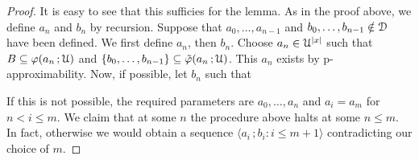 \documentclass{amsproc}
\begin{document}
{\begin{proof}
  
  It is easy to see that this sufficies for the lemma.
  As in the proof above, we define $a_n$ and $b_n$ by recursion.
  Suppose that $a_0,\dots,a_{n-1}$ and $b_0,\dots,b_{n-1}\notin{\EuScript D}$ have been defined.
  We first define $a_n$, then $b_n$. 
  Choose $a_n\in{\EuScript U}^{|x|}$ such that $B\subseteq\varphi(a_n\,;{\EuScript U})$ and $\{b_0,\dots,b_{n-1}\}\subseteq\tilde\varphi(a_n\,;{\EuScript U})$.
  This $a_n$ exists by p-approximability.
  Now, if possible, let $b_n$ such that

  
  If this is not possible, the required parameters are $a_0,\dots,a_n$ and $a_i=a_m$ for $n<i\le m$.
  We claim that at some $n$ the procedure above halts at some $n\le m$.
  In fact, otherwise we would obtain a sequence $\langle a_i\,;b_i : i\le m+1\rangle$ contradicting our choice of $m$.
\end{proof}

\newcommand\biburl[1]{\url{#1}}

\begin{bibdiv}
\begin{biblist}[]\normalsize





\end{biblist}
\end{bibdiv}}
\end{document}
